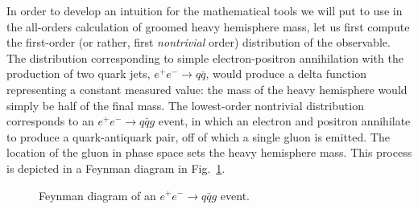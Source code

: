\documentclass[../thesis.tex]{subfiles}
\begin{document}
	In order to develop an intuition for the mathematical tools we will put to use in the all-orders calculation of groomed heavy hemisphere mass, let us first compute the first-order (or rather, first \textit{nontrivial} order) distribution of the observable. The distribution corresponding to simple electron-positron annihilation with the production of two quark jets, $e^+ e^- \to q\bar q$, would produce a delta function representing a constant measured value: the mass of the heavy hemisphere would simply be half of the final mass. The lowest-order nontrivial distribution corresponds to an $e^+ e^- \to q\bar q g$ event, in which an electron and positron annihilate to produce a quark-antiquark pair, off of which a single gluon is emitted. The location of the gluon in phase space sets the heavy hemisphere mass. This process is depicted in a Feynman diagram in Fig.~\ref{leading-fig:first-order diagram}.

	\begin{figure}[h!]
	\begin{center}

		\caption{\label{leading-fig:first-order diagram}Feynman diagram of an $e^+ e^- \to q\bar q g$ event.}
	\end{center}
	\end{figure}
\end{document}

